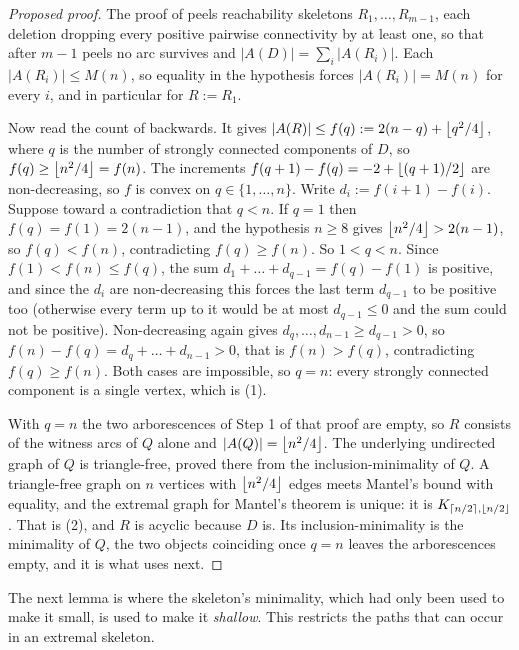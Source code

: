 \begin{proof}[Proposed proof]
The proof of  peels reachability skeletons $R_1, \dots, R_{m-1}$, each deletion dropping every positive pairwise connectivity by at least one, so that after $m-1$ peels no arc survives and $|A(D)| = \sum_i |A(R_i)|$. Each $|A(R_i)| \le M(n)$, so equality in the hypothesis forces $|A(R_i)| = M(n)$ for every $i$, and in particular for $R := R_1$.

Now read the count of  backwards. It gives $|A(R)| \le f(q) := 2(n-q) + \left\lfloor q^2/4 \right\rfloor$, where $q$ is the number of strongly connected components of $D$, so $f(q) \ge \left\lfloor n^2/4 \right\rfloor = f(n)$. The increments $f(q+1) - f(q) = -2 + \left\lfloor (q+1)/2 \right\rfloor$ are non-decreasing, so $f$ is convex on $q \in \{1, \dots, n\}$. Write $d_i := f(i+1) - f(i)$. Suppose toward a contradiction that $q < n$. If $q = 1$ then $f(q) = f(1) = 2(n-1)$, and the hypothesis $n \ge 8$ gives $\left\lfloor n^2/4 \right\rfloor > 2(n-1)$, so $f(q) < f(n)$, contradicting $f(q) \ge f(n)$. So $1 < q < n$. Since $f(1) < f(n) \le f(q)$, the sum $d_1 + \dots + d_{q-1} = f(q) - f(1)$ is positive, and since the $d_i$ are non-decreasing this forces the last term $d_{q-1}$ to be positive too (otherwise every term up to it would be at most $d_{q-1} \le 0$ and the sum could not be positive). Non-decreasing again gives $d_q, \dots, d_{n-1} \ge d_{q-1} > 0$, so $f(n) - f(q) = d_q + \dots + d_{n-1} > 0$, that is $f(n) > f(q)$, contradicting $f(q) \ge f(n)$. Both cases are impossible, so $q = n$: every strongly connected component is a single vertex, which is (1).

With $q = n$ the two arborescences of Step 1 of that proof are empty, so $R$ consists of the witness arcs of $Q$ alone and $|A(Q)| = \left\lfloor n^2/4 \right\rfloor$. The underlying undirected graph of $Q$ is triangle-free, proved there from the inclusion-minimality of $Q$. A triangle-free graph on $n$ vertices with $\left\lfloor n^2/4 \right\rfloor$ edges meets Mantel's bound \cite{Mantel07} with equality, and the extremal graph for Mantel's theorem is unique: it is $K_{\left\lceil n/2 \right\rceil,\left\lfloor n/2 \right\rfloor}$. That is (2), and $R$ is acyclic because $D$ is. Its inclusion-minimality is the minimality of $Q$, the two objects coinciding once $q = n$ leaves the arborescences empty, and it is what  uses next.
\end{proof}

The next lemma is where the skeleton's minimality, which had only been used to make it small, is used to make it \emph{shallow}. This restricts the paths that can occur in an extremal skeleton.

